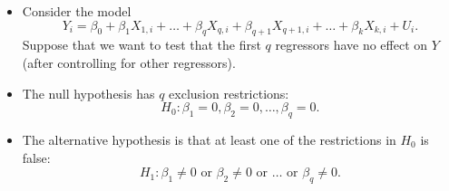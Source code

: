 \documentclass[notes=show,compress,beamer]{beamer}
\begin{document}
\begin{frame}%


\begin{itemize}
\item Consider the model%
\begin{equation*}
Y_{i}=\beta _{0}+\beta _{1}X_{1,i}+\ldots +\beta _{q}X_{q,i}+\beta
_{q+1}X_{q+1,i}+\ldots +\beta _{k}X_{k,i}+U_{i}.
\end{equation*}%
Suppose that we want to test that the first $q$ regressors have no effect on 
$Y$ (after controlling for other regressors).%
\pause%

\item The null hypothesis has $q$ 
\color{blue}%
exclusion 
\color{black}
restrictions:%
\begin{equation*}
H_{0}:\beta _{1}=0,\beta _{2}=0,\ldots ,\beta _{q}=0.
\end{equation*}%
\pause%

\item The alternative hypothesis is that at least one of the restrictions in 
$H_{0}$ is false:%
\begin{equation*}
H_{1}:\beta _{1}\neq 0\text{ or }\beta _{2}\neq 0\text{ or \ldots\ or }\beta
_{q}\neq 0.
\end{equation*}
\end{itemize}

\end{frame}%
\end{document}
